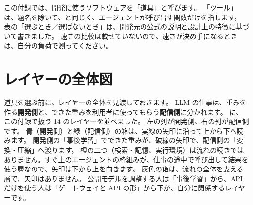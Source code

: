 この付録では、開発に使うソフトウェアを「道具」と呼びます。
「ツール」は、題名を除いて、と同じく、エージェントが呼び出す関数だけを指します。
表の「選ぶとき／選ばないとき」は、開発元の公式の説明と設計上の特徴に基づいて書きました。
速さの比較は載せていないので、速さが決め手になるときは、自分の負荷で測ってください。

\section{レイヤーの全体図}\label{sec:tm-map}

道具を選ぶ前に、レイヤーの全体を見渡しておきます。
LLM の仕事は、重みを作る\textbf{開発側}と、できた重みを利用者に使ってもらう\textbf{配信側}に分かれます。
に、この付録で扱う 14 のレイヤーを並べました。
左の列が開発側、右の列が配信側です。
青（開発側）と緑（配信側）の箱は、実線の矢印に沿って上から下へ読みます。
開発側の「事後学習」でできた重みが、破線の矢印で、配信側の「変換・圧縮」へ渡ります。
橙の二つ（検索・記憶、実行環境）は流れの続きではありません。すぐ上のエージェントの枠組みが、仕事の途中で呼び出して結果を使う層なので、矢印は下から上を向きます。
灰色の箱は、流れの全体を支える層で、矢印はありません。
公開モデルを調整する人は「事後学習」から、API だけを使う人は「ゲートウェイと API の形」から下が、自分に関係するレイヤーです。

